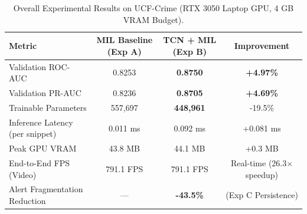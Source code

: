 \begin{table}[h]
\centering
\caption{Overall Experimental Results on UCF-Crime (RTX 3050 Laptop GPU, 4 GB VRAM Budget).}
\label{tab:main_results}
\begin{tabular}{lccc}
\hline
\textbf{Metric} & \textbf{MIL Baseline (Exp A)} & \textbf{TCN + MIL (Exp B)} & \textbf{Improvement} \\
\hline
Validation ROC-AUC & 0.8253 & \textbf{0.8750} & \textbf{+4.97\%} \\
Validation PR-AUC & 0.8236 & \textbf{0.8705} & \textbf{+4.69\%} \\
Trainable Parameters & 557,697 & \textbf{448,961} & -19.5\% \\
Inference Latency (per snippet) & 0.011 ms & 0.092 ms & +0.081 ms \\
Peak GPU VRAM & 43.8 MB & 44.1 MB & +0.3 MB \\
End-to-End FPS (Video) & 791.1 FPS & 791.1 FPS & Real-time (26.3$\times$ speedup) \\
Alert Fragmentation Reduction & --- & \textbf{-43.5\%} & (Exp C Persistence) \\
\hline
\end{tabular}
\end{table}
